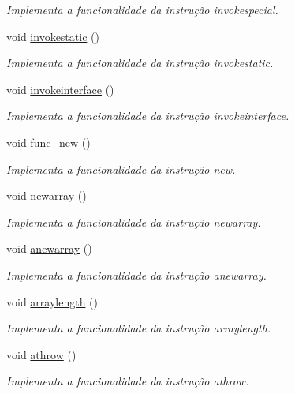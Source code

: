 \begin{DoxyCompactItemize}
\begin{DoxyCompactList}\small\item\em Implementa a funcionalidade da instrução invokespecial. \end{DoxyCompactList}\item 
void \hyperlink{classOperations_a562d8c9cc5975de2ee6d1a95e1969724}{invokestatic} ()
\begin{DoxyCompactList}\small\item\em Implementa a funcionalidade da instrução invokestatic. \end{DoxyCompactList}\item 
void \hyperlink{classOperations_a9206595fad5d3ac24514b2dfd6a013da}{invokeinterface} ()
\begin{DoxyCompactList}\small\item\em Implementa a funcionalidade da instrução invokeinterface. \end{DoxyCompactList}\item 
void \hyperlink{classOperations_a7594e147407e1f4ede57229899fd17d6}{func\+\_\+new} ()
\begin{DoxyCompactList}\small\item\em Implementa a funcionalidade da instrução new. \end{DoxyCompactList}\item 
void \hyperlink{classOperations_a3537f097b63240202ac0c9249dda33a9}{newarray} ()
\begin{DoxyCompactList}\small\item\em Implementa a funcionalidade da instrução newarray. \end{DoxyCompactList}\item 
void \hyperlink{classOperations_aa5110e66aa565e9130be292935ef5c71}{anewarray} ()
\begin{DoxyCompactList}\small\item\em Implementa a funcionalidade da instrução anewarray. \end{DoxyCompactList}\item 
void \hyperlink{classOperations_ae01c8bce2d6a583151dc0e46d1b8d52f}{arraylength} ()
\begin{DoxyCompactList}\small\item\em Implementa a funcionalidade da instrução arraylength. \end{DoxyCompactList}\item 
void \hyperlink{classOperations_a2a5eea0fb18391bb3854dfe55c8ac5d3}{athrow} ()
\begin{DoxyCompactList}\small\item\em Implementa a funcionalidade da instrução athrow. \end{DoxyCompactList}\item 

\end{DoxyCompactItemize}
